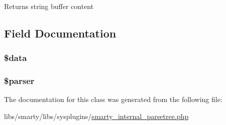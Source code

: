 \begin{DoxyReturn}{Returns}
string buffer content 
\end{DoxyReturn}


\subsection{Field Documentation}
\hypertarget{class__smarty__parsetree_a6efc15b5a2314dd4b5aaa556a375c6d6}{}
\subsubsection[{\$data}]{\setlength{\rightskip}{0pt plus 5cm}\$data}\label{class__smarty__parsetree_a6efc15b5a2314dd4b5aaa556a375c6d6}
\hypertarget{class__smarty__parsetree_a147a766daa03d52576c7345fea31c945}{}
\subsubsection[{\$parser}]{\setlength{\rightskip}{0pt plus 5cm}\$parser}\label{class__smarty__parsetree_a147a766daa03d52576c7345fea31c945}


The documentation for this class was generated from the following file\+:\begin{DoxyCompactItemize}
\item 
libs/smarty/libs/sysplugins/\hyperlink{smarty__internal__parsetree_8php}{smarty\+\_\+internal\+\_\+parsetree.\+php}\end{DoxyCompactItemize}

